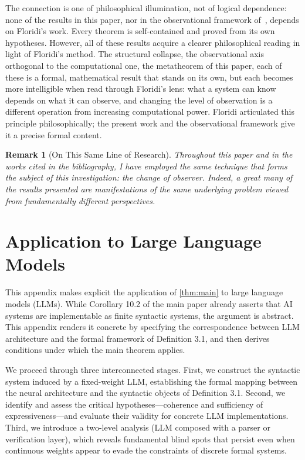 \documentclass[11pt]{article}
\newtheorem{remark}[theorem]{Remark}
\begin{document}
\smallskip

The connection is one of philosophical illumination, not of logical
dependence: none of the results in this paper, nor in the observational
framework of~\cite{buono2026framework,buono2026observer}, depends on Floridi's
work. Every theorem is self-contained and proved from its own
hypotheses. However, all of these results acquire a clearer
philosophical reading in light of Floridi's method. The structural
collapse, the observational axis orthogonal to the computational one,
the metatheorem of this paper, each of these is a formal,
mathematical result that stands on its own, but each becomes more
intelligible when read through Floridi's lens: what a system can know
depends on what it can observe, and changing the level of observation is
a different operation from increasing computational power. Floridi
articulated this principle philosophically; the present work and the
observational framework give it a precise formal content.

\begin{remark}[On This Same Line of Research]

Throughout this paper and in the works cited in the bibliography, I have 
employed the same technique that forms the subject of this investigation: 
the change of observer. Indeed, a great many of the results presented 
are manifestations of the same underlying problem viewed from fundamentally 
different perspectives.
    
\end{remark}
    

 



\appendix

\section{Application to Large Language Models}
\label{app:llm}

This appendix makes explicit the application of \ref{thm:main} to large language models (LLMs). While Corollary 10.2 of the main paper already asserts that AI systems are implementable as finite syntactic systems, the argument is abstract. This appendix renders it concrete by specifying the correspondence between LLM architecture and the formal framework of Definition 3.1, and then derives conditions under which the main theorem applies.

We proceed through three interconnected stages. First, we construct the syntactic system induced by a fixed-weight LLM, establishing the formal mapping between the neural architecture and the syntactic objects of Definition 3.1. Second, we identify and assess the critical hypotheses—coherence and sufficiency of expressiveness—and evaluate their validity for concrete LLM implementations. Third, we introduce a two-level analysis (LLM composed with a parser or verification layer), which reveals fundamental blind spots that persist even when continuous weights appear to evade the constraints of discrete formal systems.
\end{document}
